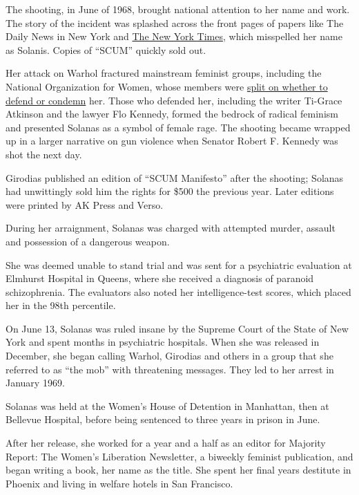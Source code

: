 The shooting, in June of 1968, brought national attention to her name
and work. The story of the incident was splashed across the front pages
of papers like The Daily News in New York and
\href{https://timesmachine.nytimes.com/timesmachine/1968/06/04/91229352.html?pageNumber=1}{The
New York Times}, which misspelled her name as Solanis. Copies of
``SCUM'' quickly sold out.

Her attack on Warhol fractured mainstream feminist groups, including the
National Organization for Women, whose members were
\href{https://timesmachine.nytimes.com/timesmachine/1968/06/14/88953203.html?pdf_redirect=true\&ip=0\&pageNumber=52}{split
on whether to defend or condemn} her. Those who defended her, including
the writer Ti-Grace Atkinson and the lawyer Flo Kennedy, formed the
bedrock of radical feminism and presented Solanas as a symbol of female
rage. The shooting became wrapped up in a larger narrative on gun
violence when Senator Robert F. Kennedy was shot the next day.

Girodias published an edition of ``SCUM Manifesto'' after the shooting;
Solanas had unwittingly sold him the rights for \$500 the previous year.
Later editions were printed by AK Press and Verso.

During her arraignment, Solanas was charged with attempted murder,
assault and possession of a dangerous weapon.

She was deemed unable to stand trial and was sent for a psychiatric
evaluation at Elmhurst Hospital in Queens, where she received a
diagnosis of paranoid schizophrenia. The evaluators also noted her
intelligence-test scores, which placed her in the 98th percentile.

On June 13, Solanas was ruled insane by the Supreme Court of the State
of New York and spent months in psychiatric hospitals. When she was
released in December, she began calling Warhol, Girodias and others in a
group that she referred to as ``the mob'' with threatening messages.
They led to her arrest in January 1969.

Solanas was held at the Women's House of Detention in Manhattan, then at
Bellevue Hospital, before being sentenced to three years in prison in
June.

After her release, she worked for a year and a half as an editor for
Majority Report: The Women's Liberation Newsletter, a biweekly feminist
publication, and began writing a book, her name as the title. She spent
her final years destitute in Phoenix and living in welfare hotels in San
Francisco.


